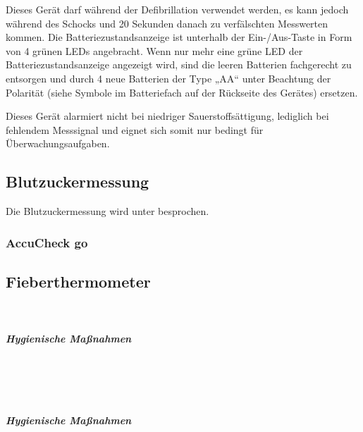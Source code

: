  

Dieses Gerät darf während der Defibrillation verwendet werden, es kann jedoch während des
Schocks und 20 Sekunden danach zu verfälschten Messwerten kommen.
Die Batteriezustandsanzeige ist unterhalb der Ein-/Aus-Taste in Form von 4 grünen LEDs
angebracht. Wenn nur mehr eine grüne LED der Batteriezustandsanzeige angezeigt wird, sind
die leeren Batterien fachgerecht zu entsorgen und durch 4 neue Batterien der Type „AA“
unter Beachtung der Polarität (siehe Symbole im Batteriefach auf der Rückseite des Gerätes)
ersetzen.

Dieses Gerät alarmiert nicht bei niedriger Sauerstoffsättigung, lediglich bei fehlendem
Messsignal und eignet sich somit nur bedingt für Überwachungsaufgaben.


\subsection{Blutzuckermessung}

Die Blutzuckermessung wird unter
 besprochen.

\subsubsection{AccuCheck go}

{\TakeNotesLarge}

\subsection{Fieberthermometer}



{~

\TakeNotesLarge

\subparagraph{Hygienische Maßnahmen}~

\TakeNotesMedium
}{}{}{}{}

{~

\TakeNotesLarge

\subparagraph{Hygienische Maßnahmen}~

\TakeNotesMedium
}{}{}{}{}









